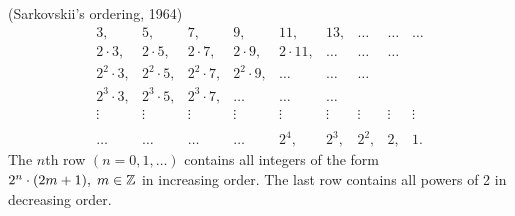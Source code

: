 \documentclass[12pt,twoside,draft]{book}
\begin{document}
\begin{definition}
  (Sarkovskii's ordering, 1964)
  \[
    \begin{array}{ccccccccc}
    3, & 5, & 7, & 9, & 11, & 13, & \ldots & \ldots & \ldots\\
    2\cdot 3, & 2\cdot 5, & 2\cdot 7, & 2\cdot 9, & 2\cdot 11, & \ldots & \ldots & \ldots\\
    2^2\cdot 3, & 2^2\cdot 5, & 2^2\cdot 7, & 2^2\cdot 9, & \ldots & \ldots & \ldots\\
    2^3\cdot 3, & 2^3\cdot 5, & 2^3\cdot 7, & \ldots & \ldots & \ldots\\
    \vdots & \vdots & \vdots & \vdots & \vdots & \vdots & \vdots & \vdots  & \vdots \\
    \\
    \ldots & \ldots & \ldots & \ldots & 2^4, & 2^3, & 2^2, & 2, & 1.
  \end{array}
  \]
  The $n$th row $(n = 0, 1, \ldots)$ contains all integers of the form $2^n\cdot (2m + 1),\; m \in \mathbb{Z}$ in increasing order.
  The last row contains all powers of 2 in decreasing order.
  \label{defn:sarkovskiiordering}
\end{definition}
 



\printindex
\end{document}
